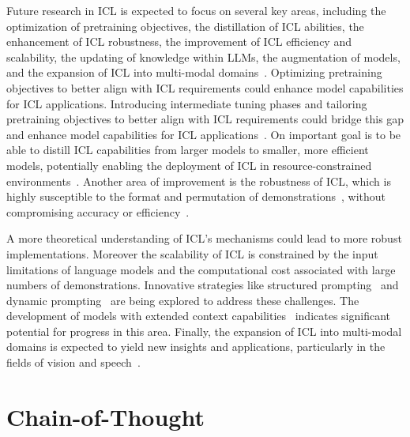 Future research in ICL is expected to focus on several key areas, including the optimization of pretraining objectives, the distillation of ICL abilities, the enhancement of ICL robustness, the improvement of ICL efficiency and scalability, the updating of knowledge within LLMs, the augmentation of models, and the expansion of ICL into multi-modal domains~\cite{dong2023survey}.
Optimizing pretraining objectives to better align with ICL requirements could enhance model capabilities for ICL applications.
Introducing intermediate tuning phases and tailoring pretraining objectives to better align with ICL requirements could bridge this gap and enhance model capabilities for ICL applications~\cite{shin2022effect}.
On important goal is to be able to distill ICL capabilities from larger models to smaller, more efficient models, potentially enabling the deployment of ICL in resource-constrained environments~\cite{magister2022teaching}.
Another area of improvement is the robustness of ICL, which is highly susceptible to the format and permutation of demonstrations~\cite{zhao2021calibrate, lu2022fantastically}, without compromising accuracy or efficiency~\cite{chen2024relation}.

A more theoretical understanding of ICL's mechanisms could lead to more robust implementations.
Moreover the scalability of ICL is constrained by the input limitations of language models and the computational cost associated with large numbers of demonstrations.
Innovative strategies like structured prompting~\cite{hao2022structured} and dynamic prompting~\cite{wang2023efficient} are being explored to address these challenges.
The development of models with extended context capabilities~\cite{li2023contextual} indicates significant potential for progress in this area.
Finally, the expansion of ICL into multi-modal domains is expected to yield new insights and applications, particularly in the fields of vision and speech~\cite{dong2023survey}.


\section{Chain-of-Thought}
\label{sec:chain-of-thought}

